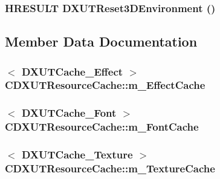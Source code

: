 \label{class_c_d_x_u_t_resource_cache_a3b09c83d5019bcc724c80b297c581f90}
\hypertarget{class_c_d_x_u_t_resource_cache_ad0f752da1fdf43f04bf43f8210d6e5f0}{
\subsubsection[{DXUTReset3DEnvironment}]{\setlength{\rightskip}{0pt plus 5cm}HRESULT DXUTReset3DEnvironment ()}}
\label{class_c_d_x_u_t_resource_cache_ad0f752da1fdf43f04bf43f8210d6e5f0}


\subsection{Member Data Documentation}
\hypertarget{class_c_d_x_u_t_resource_cache_a8dedf93e482bd77018709733a6c664c0}{
\subsubsection[{m\_\-EffectCache}]{$<$ {\bf DXUTCache\_\-Effect} $>$ {\bf CDXUTResourceCache::m\_\-EffectCache}}}
\label{class_c_d_x_u_t_resource_cache_a8dedf93e482bd77018709733a6c664c0}
\hypertarget{class_c_d_x_u_t_resource_cache_a014f0621996d9fdb9ad32630ba1d9afa}{
\subsubsection[{m\_\-FontCache}]{$<$ {\bf DXUTCache\_\-Font} $>$ {\bf CDXUTResourceCache::m\_\-FontCache}}}
\label{class_c_d_x_u_t_resource_cache_a014f0621996d9fdb9ad32630ba1d9afa}
\hypertarget{class_c_d_x_u_t_resource_cache_a78a0625d24096363227bf95d51f129ad}{
\subsubsection[{m\_\-TextureCache}]{$<$ {\bf DXUTCache\_\-Texture} $>$ {\bf CDXUTResourceCache::m\_\-TextureCache}}}
\label{class_c_d_x_u_t_resource_cache_a78a0625d24096363227bf95d51f129ad}


